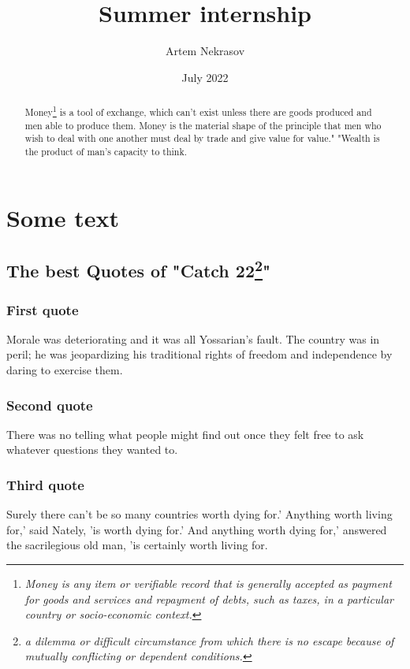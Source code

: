 \documentclass[14pt,a4paper]{report}
\title{Summer internship}
\author{Artem Nekrasov}
\date{July 2022}
\begin{document}
\maketitle

\begin{abstract}
Money\footnote{\textit{Money is any item or verifiable record that is generally accepted as payment for goods and services and repayment of debts, such as taxes, in a particular country or socio-economic context.}} is a tool of exchange, which can't exist unless there are goods produced and men able to produce them. Money is the material shape of the principle that men who wish to deal with one another must deal by trade and give value for value." "Wealth is the product of man's capacity to think\cite{rand2005atlas}.
\end{abstract}

\clearpage

\tableofcontents
\part{Some text}
\chapter[The best Quotes of "Catch 22"]{The best Quotes of "Catch 22\footnote{\textit{a dilemma or difficult circumstance from which there is no escape because of mutually conflicting or dependent conditions.}}"}

\section{First quote}
Morale was deteriorating and it was all Yossarian's fault. The country was in peril; he was jeopardizing his traditional rights of freedom and independence by daring to exercise them\cite{heller1999catch}.

\section{Second quote}
There was no telling what people might find out once they felt free to ask whatever questions they wanted to\cite{heller1999catch}.

\section{Third quote}
Surely there can't be so many countries worth dying for.'
Anything worth living for,' said Nately, 'is worth dying for.'
And anything worth dying for,' answered the sacrilegious old man, 'is certainly worth living for\cite{heller1999catch}.
\end{document}
